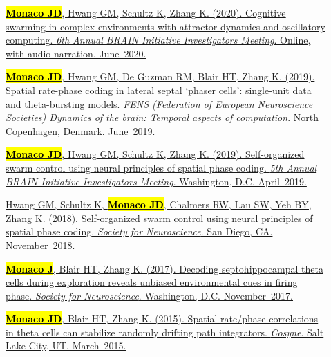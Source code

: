 \documentclass[10pt]{article}
\newcommand{\itemtitle}[1]{{\color{hopkinsblue}\ul{#1}}}
\newcommand{\joehl}[1]{\hl{\textbf{#1}}}
\begin{document}
\begin{description}
  \item[\quad]
    \href{https://www.cvent.com/events/6th-annual-brain-initiative-investigators-meeting/custom-116-4e2aadaa6cd549a3a4b53113cd172ad2.aspx}
    {\joehl{Monaco JD}, Hwang GM, Schultz K, Zhang K. (2020).
      \itemtitle{Cognitive swarming in complex environments with attractor
      dynamics and oscillatory computing}. \emph{6th Annual BRAIN Initiative
    Investigators Meeting}. Online, with audio narration. June~2020.}
  \item[\quad]
    \href{https://www.fens.org/Meetings/The-Brain-Conferences/Dynamics-of-the-brain/}
    {\joehl{Monaco JD}, Hwang GM, De Guzman RM, Blair HT, Zhang K. (2019).
      \itemtitle{Spatial rate-phase coding in lateral septal ‘phaser cells’:
      single-unit data and theta-bursting models}. \emph{FENS (Federation of
        European Neuroscience Societies) Dynamics of the brain: Temporal aspects of
    computation}. North Copenhagen, Denmark. June~2019.}
  \item[\quad]
    \href{https://www.cvent.com/events/5th-annual-brain-initiative-investigators-meeting/event-summary-de9c0d8f934b46eb8d80b55bcfbfe96a.aspx}
    {\joehl{Monaco JD}, Hwang GM, Schultz K, Zhang K. (2019).
      \itemtitle{Self-organized swarm control using neural principles of spatial
      phase coding}. \emph{5th Annual BRAIN Initiative Investigators Meeting}.
    Washington, D.C. April~2019.} 
  \item[\quad]
    \href{https://abstractsonline.com/pp8/#!/4649/presentation/10884}
    {Hwang GM, Schultz K, \joehl{Monaco JD}, Chalmers RW, Lau SW, Yeh BY,
      Zhang K. (2018). \itemtitle{Self-organized swarm control using neural
      principles of spatial phase coding}. \emph{Society for Neuroscience}.
    San Diego, CA. November~2018.}
  \item[\quad]
    \href{https://www.abstractsonline.com/pp8/#!/4376/presentation/6085}
    {\joehl{Monaco J}, Blair HT, Zhang K. (2017). \itemtitle{Decoding
        septohippocampal theta cells during exploration reveals unbiased
      environmental cues in firing phase}. \emph{Society for Neuroscience}.
    Washington, D.C. November~2017.}
  \item[\quad]
    \href{https://jdmonaco.com/files/monaco-paper-cosyne15.pdf}
    {\joehl{Monaco JD}, Blair HT, Zhang K. (2015). \itemtitle{Spatial
        rate/phase correlations in theta cells can stabilize randomly drifting path
    integrators}. \emph{Cosyne}. Salt Lake City, UT. March~2015.}

\end{description}
\end{document}
